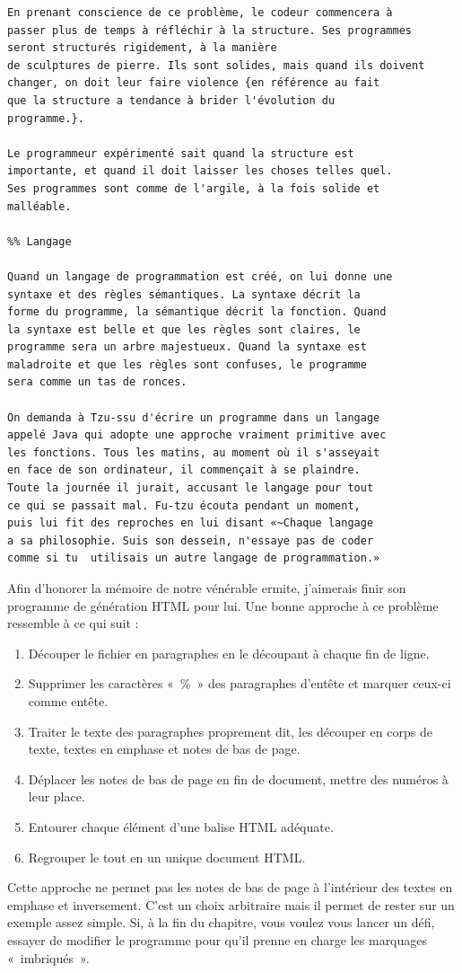\documentclass{FramateX}
\begin{document}
\begin{lstlisting}
En prenant conscience de ce problème, le codeur commencera à
passer plus de temps à réfléchir à la structure. Ses programmes
seront structurés rigidement, à la manière
de sculptures de pierre. Ils sont solides, mais quand ils doivent
changer, on doit leur faire violence {en référence au fait
que la structure a tendance à brider l'évolution du
programme.}.

Le programmeur expérimenté sait quand la structure est
importante, et quand il doit laisser les choses telles quel.
Ses programmes sont comme de l'argile, à la fois solide et
malléable.

%% Langage

Quand un langage de programmation est créé, on lui donne une
syntaxe et des règles sémantiques. La syntaxe décrit la
forme du programme, la sémantique décrit la fonction. Quand
la syntaxe est belle et que les règles sont claires, le
programme sera un arbre majestueux. Quand la syntaxe est
maladroite et que les règles sont confuses, le programme
sera comme un tas de ronces.

On demanda à Tzu-ssu d'écrire un programme dans un langage
appelé Java qui adopte une approche vraiment primitive avec
les fonctions. Tous les matins, au moment où il s'asseyait
en face de son ordinateur, il commençait à se plaindre.
Toute la journée il jurait, accusant le langage pour tout
ce qui se passait mal. Fu-tzu écouta pendant un moment,
puis lui fit des reproches en lui disant «~Chaque langage
a sa philosophie. Suis son dessein, n'essaye pas de coder
comme si tu  utilisais un autre langage de programmation.»
\end{lstlisting}
\begin{center}\end{center}

Afin d'honorer la mémoire de notre vénérable ermite, j'aimerais finir
son programme de génération HTML pour lui. Une bonne approche à ce
problème ressemble à ce qui suit :

\begin{enumerate}
\item
  Découper le fichier en paragraphes en le découpant à chaque fin de
  ligne.
\item
  Supprimer les caractères «~\%~» des paragraphes d'entête et marquer
  ceux-ci comme entête.
\item
  Traiter le texte des paragraphes proprement dit, les découper en corps
  de texte, textes en emphase et notes de bas de page.
\item
  Déplacer les notes de bas de page en fin de document, mettre des
  numéros à leur place.
\item
  Entourer chaque élément d'une balise HTML adéquate.
\item
  Regrouper le tout en un unique document HTML.
\end{enumerate}
Cette approche ne permet pas les notes de bas de page à l'intérieur des
textes en emphase et inversement. C'est un choix arbitraire mais il
permet de rester sur un exemple assez simple. Si, à la fin du chapitre,
vous voulez vous lancer un défi, essayer de modifier le programme pour
qu'il prenne en charge les marquages «~imbriqués~».
\end{document}

